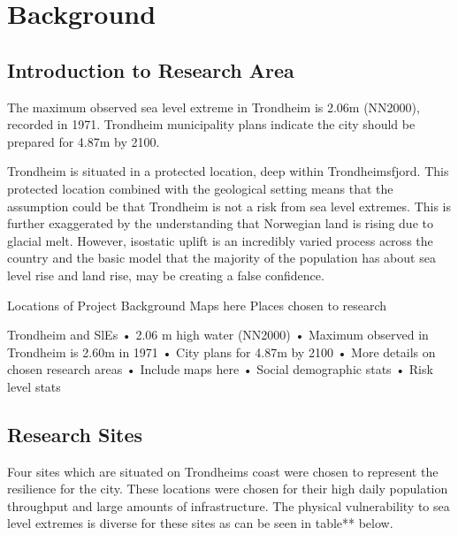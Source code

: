 \chapter{Background}

\section{Introduction to Research Area}

The maximum observed sea level extreme in Trondheim is 2.06m (NN2000), recorded in 1971. Trondheim municipality plans indicate the city should be prepared for 4.87m by 2100. 

Trondheim is situated in a protected location, deep within Trondheimsfjord. This protected location combined with the geological setting means that the assumption could be that Trondheim is not a risk from sea level extremes. This is further exaggerated by the understanding that Norwegian land is rising due to glacial melt. However, isostatic uplift is an incredibly varied process across the country and the basic model that the majority of the population has about sea level rise and land rise, may be creating a false confidence. 



Locations of Project Background
Maps here
Places chosen to research 

Trondheim and SlEs
•	2.06 m high water (NN2000)
•	Maximum observed in Trondheim is 2.60m in 1971
•	City plans for 4.87m by 2100
•	More details on chosen research areas
•	Include maps here 
•	Social demographic stats
•	Risk level stats

\section{Research Sites}
Four sites which are situated on Trondheims coast were chosen to represent the resilience for the city. These locations were chosen for their high daily population throughput and large amounts of infrastructure. The physical vulnerability to sea level extremes is diverse for these sites as can be seen in table** below. 

